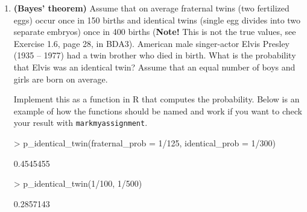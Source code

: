 \documentclass[11pt,a4paper,english]{article}
\begin{document}
\begin{enumerate}
\item {\bf (Bayes' theorem)} Assume that on average fraternal twins (two fertilized eggs) occur once in 150 births and identical twins (single egg divides into two separate
embryos) once in 400 births (\textbf{Note!} This is not the true values, see Exercise 1.6, page 28, in BDA3).
American male singer-actor Elvis Presley (1935 -- 1977) had a twin brother who died in birth.
What is the probability that Elvis was an identical twin?
Assume that an equal number of boys and girls are born on average.

Implement this as a function in R that computes the probability. Below is an example of how the functions should be named and work if you want to check your result with \texttt{markmyassignment}. 


\begin{Schunk}
\begin{Sinput}
> p_identical_twin(fraternal_prob = 1/125, identical_prob = 1/300)
\end{Sinput}
\begin{Soutput}
[1] 0.4545455
\end{Soutput}
\end{Schunk}


\begin{Schunk}
\begin{Sinput}
> p_identical_twin(1/100, 1/500)
\end{Sinput}
\begin{Soutput}
[1] 0.2857143
\end{Soutput}
\end{Schunk}

\end{enumerate}
\end{document}
